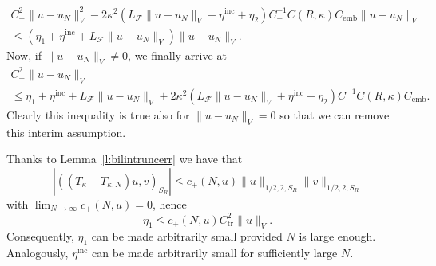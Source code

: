 \documentclass[12pt,DIV=14]{scrartcl}
\begin{document}
\begin{gather*}
C_-^2 \|u-u_N\|_V^2 -2\kappa^2\left(L_\mathcal{F} \|u-u_N\|_V
+ \eta^\mathrm{inc} +\eta_2\right) C_-^{-1}C(R,\kappa) C_\mathrm{emb}\|u-u_N\|_V\\
\le \left(\eta_1 + \eta^\mathrm{inc} + L_\mathcal{F} \|u-u_N\|_V\right) \|u-u_N\|_V.
\end{gather*}
Now, if $\|u-u_N\|_V\ne 0$, we finally arrive at
\begin{equation}\label{eq:intermedee}
\begin{gathered}
C_-^2 \|u-u_N\|_V \\
\le \eta_1 + \eta^\mathrm{inc} + L_\mathcal{F} \|u-u_N\|_V
+ 2\kappa^2\left(L_\mathcal{F} \|u-u_N\|_V
+ \eta^\mathrm{inc} +\eta_2\right) C_-^{-1}C(R,\kappa) C_\mathrm{emb}.
\end{gathered}
\end{equation}
Clearly this inequality is true also for $\|u-u_N\|_V = 0$ so that we can
remove this interim assumption.

Thanks to Lemma~\ref{l:bilintruncerr} we have that
\[
\left|\left((T_\kappa - T_{\kappa,N}) u,v\right)_{S_R}\right|
\le c_+(N,u)\|u\|_{1/2,2,S_R}\|v\|_{1/2,2,S_R}
\]
with $\lim_{N\to\infty}c_+(N,u) = 0$,
hence
\begin{equation}\label{eq:eta1est}
\eta_1 \le c_+(N,u) C_\mathrm{tr}^2 \|u\|_V.
\end{equation}
Consequently, $\eta_1$ can be made arbitrarily small provided $N$ is large enough.
Analogously, $\eta^\mathrm{inc}$ can be made arbitrarily small for sufficiently large $N$.
\end{document}
